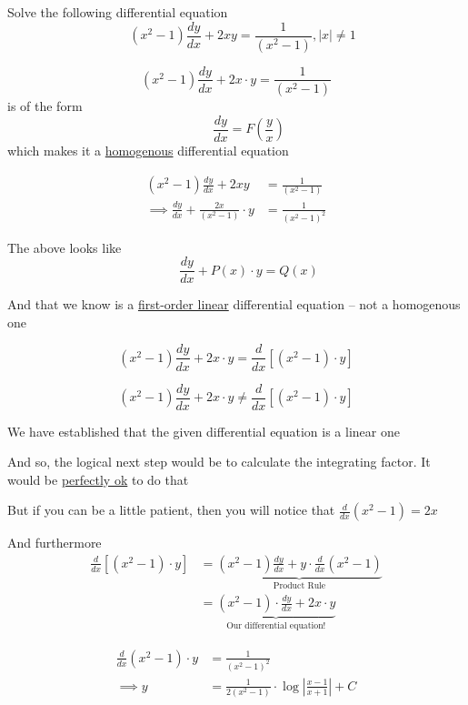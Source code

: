 \documentclass[14pt,fleqn]{extarticle}
\begin{document}
\newcommand\ea{ \left(x^2-1 \right)}
Solve the following differential equation
\[ \quad \ea\frac{dy}{dx} + 2xy = \frac{1}{\ea}, \vert x\vert \neq 1\]
%

\newcard

\[ \ea\frac{dy}{dx} + 2x\cdot y = \frac{1}{\ea}\]
is of the form \[ \qquad \frac{dy}{dx} = F \left(\frac{y}{x} \right)\]
which makes it a \underline{homogenous} differential equation
\newcard 

\begin{align}
	\ea \frac{dy}{dx}+ 2xy &= \frac{1}{\ea} \\
	\implies \frac{dy}{dx} + \frac{2x}{\ea}\cdot y&= \frac{1}{\ea^2}
\end{align}

The above looks like 
\[ \qquad \frac{dy}{dx} + P(x)\cdot y = Q(x) \]

And that we know is a \underline{first-order linear} differential equation -- not a homogenous one 

\newcard 

\[ \ea \frac{dy}{dx} + 2x\cdot y = \frac{d}{dx} \left[\ea\cdot y \right]\]

\newcard 

\[ \ea \frac{dy}{dx} + 2x\cdot y \neq \frac{d}{dx} \left[\ea\cdot y \right]\]

\newcard 

We have established that the given differential equation is a linear one\newline 

And so, the logical next step would be to calculate the integrating factor. It would be \underline{perfectly ok} to do that\newline 

But if you can be a little patient, then you will notice that $\frac{d}{dx}\ea = 2x$\newline  

And furthermore 
\begin{align}
\frac{d}{dx} \left[\ea\cdot y \right] &= \underbrace{\ea \frac{dy}{dx} + y\cdot \frac{d}{dx}\ea}_{\text{Product Rule}} \\
&= \underbrace{\ea\cdot \frac{dy}{dx} + 2x\cdot y}_{\text{Our differential equation!}}
\end{align}

\newcard 

\begin{align}
	\frac{d}{dx} \ea\cdot y &= \frac{1}{\ea^2} \\
	\implies y &= \frac{1}{2\ea} \cdot \log \left\vert \frac{x-1}{x+1}\right\vert + C 
\end{align}
\end{document}
